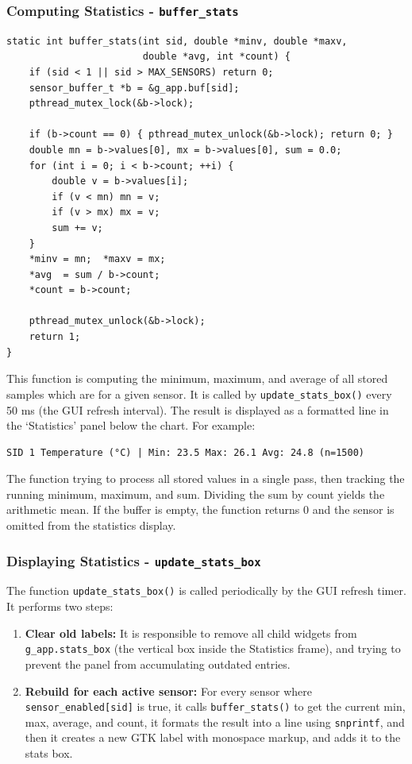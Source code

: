 \subsubsection{Computing Statistics - \texttt{buffer\_stats}}
\begin{verbatim}
static int buffer_stats(int sid, double *minv, double *maxv,
                        double *avg, int *count) {
    if (sid < 1 || sid > MAX_SENSORS) return 0;
    sensor_buffer_t *b = &g_app.buf[sid];
    pthread_mutex_lock(&b->lock);

    if (b->count == 0) { pthread_mutex_unlock(&b->lock); return 0; }
    double mn = b->values[0], mx = b->values[0], sum = 0.0;
    for (int i = 0; i < b->count; ++i) {
        double v = b->values[i];
        if (v < mn) mn = v;
        if (v > mx) mx = v;
        sum += v;
    }
    *minv = mn;  *maxv = mx;
    *avg  = sum / b->count;
    *count = b->count;

    pthread_mutex_unlock(&b->lock);
    return 1;
}
\end{verbatim}
This function is computing the minimum, maximum, and average of all stored samples which are for a given sensor. It is called by \texttt{update\_stats\_box()} every 50 ms (the GUI refresh interval). The result is displayed as a formatted line in the ‘Statistics’ panel below the chart. For example:
\begin{center}
\begin{verbatim}
SID 1 Temperature (°C) | Min: 23.5 Max: 26.1 Avg: 24.8 (n=1500)
\end{verbatim}
\end{center}

The function trying to process all stored values in a single pass, then tracking the running minimum, maximum, and sum. Dividing the sum by count yields the arithmetic mean. If the buffer is empty, the function returns 0 and the sensor is omitted from the statistics display.

\subsubsection{Displaying Statistics - \texttt{update\_stats\_box}}
The function \texttt{update\_stats\_box()} is called periodically by the GUI refresh
timer. It performs two steps:

\begin{enumerate}
    \item \textbf{Clear old labels:} It is responsible to remove all child widgets
    from \texttt{g\_app.stats\_box} (the vertical box inside the Statistics frame),
    and trying to prevent the panel from accumulating outdated entries.

    \item \textbf{Rebuild for each active sensor:} For every sensor where
    \texttt{sensor\_enabled[sid]} is true, it calls \texttt{buffer\_stats()} to get
    the current min, max, average, and count, it formats the result into a line using
    \texttt{snprintf}, and then it creates a new GTK label with monospace markup, and
    adds it to the stats box.
\end{enumerate}

